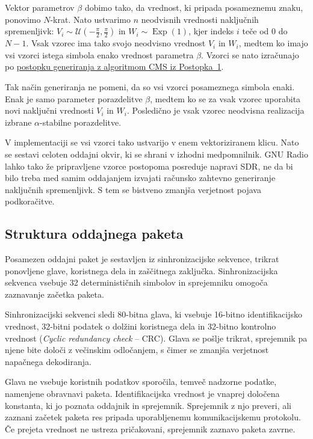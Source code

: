 \documentclass[a4paper, 12pt, openany]{book}
\begin{document}
Vektor parametrov $\beta$ dobimo tako, da vrednost, ki pripada posameznemu znaku, ponovimo $N$-krat. Nato ustvarimo $n$ neodvisnih vrednosti naključnih spremenljivk: $V_i \sim \mathcal{U}\left(-\frac{\pi}{2},\frac{\pi}{2}\right)$ in $W_i \sim \operatorname{Exp}(1)$, kjer indeks $i$ teče od $0$ do $N-1$. Vsak vzorec ima tako svojo neodvisno vrednost $V_i$ in $W_i$, medtem ko imajo vsi vzorci istega simbola enako vrednost parametra $\beta$. Vzorci se nato izračunajo po \hyperref[met:cms_generator]{postopku generiranja z algoritmom CMS iz Postopka~1}.

Tak način generiranja ne pomeni, da so vsi vzorci posameznega simbola enaki. Enak je samo parameter porazdelitve $\beta$, medtem ko se za vsak vzorec uporabita novi naključni vrednosti $V_i$ in $W_i$. Posledično je vsak vzorec neodvisna realizacija izbrane $\alpha$-stabilne porazdelitve.

V implementaciji se vsi vzorci tako ustvarijo v enem vektoriziranem klicu. Nato se sestavi celoten oddajni okvir, ki se shrani v izhodni medpomnilnik. GNU Radio lahko tako že pripravljene vzorce postopoma posreduje napravi SDR, ne da bi bilo treba med samim oddajanjem izvajati računsko zahtevno generiranje naključnih spremenljivk. S tem se bistveno zmanjša verjetnost pojava podkoračitve.

\subsection{Struktura oddajnega paketa}

Posamezen oddajni paket je sestavljen iz sinhronizacijske sekvence, trikrat ponovljene glave, koristnega dela in zaščitnega zaključka. Sinhronizacijska sekvenca vsebuje 32 determinističnih simbolov in sprejemniku omogoča zaznavanje začetka paketa.

Sinhronizacijski sekvenci sledi 80-bitna glava, ki vsebuje 16-bitno identifikacijsko vrednost, 32-bitni podatek o dolžini koristnega dela in 32-bitno kontrolno vrednost (\textit{Cyclic redundancy check} -- CRC). Glava se pošlje trikrat, sprejemnik pa njene bite določi z večinskim odločanjem, s čimer se zmanjša verjetnost napačnega dekodiranja.

Glava ne vsebuje koristnih podatkov sporočila, temveč nadzorne podatke, namenjene obravnavi paketa. Identifikacijska vrednost je vnaprej določena konstanta, ki jo poznata oddajnik in sprejemnik. Sprejemnik z njo preveri, ali zaznani začetek paketa res pripada uporabljenemu komunikacijskemu protokolu. Če prejeta vrednost ne ustreza pričakovani, sprejemnik zaznavo paketa zavrne.
\end{document}
